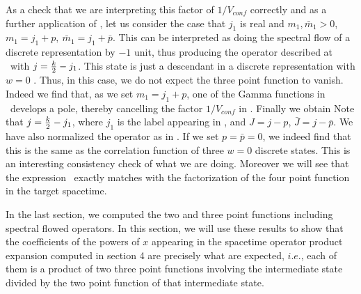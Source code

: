 As a check that we are interpreting this factor of $1/V_{conf}$
correctly and
as a further application of \threepx , let us consider the case that
$j_1$ is real and $m_1 , \bar m_1>0$, $ m_1 = j_1 + p , ~
\bar m_1 = j_1 + \bar p $.
This can be interpreted as doing the spectral flow of a discrete
representation by $-1$ unit, thus producing the operator described at
\statef\ with $j = {k \over 2} - j_1 $. This state is just a descendant
in a discrete representation with $w=0$ . Thus, in this case,
we do not expect the three point function to
vanish. Indeed we find that, as we set $m_1 = j_1 + p$,
one of the Gamma functions
in \threepx\ develops a pole, thereby cancelling the factor
$1/V_{conf}$ in \threepx . Finally we obtain
\eqn{}
Note that $j = {k \over 2} - j_1$, where $j_1$ is the label appearing
in \threepx , and $J = j- p$, $\bar J = j- \bar p$. We have also
normalized
the operator as in \newnorm .
If we set $p=\bar p =0$, we indeed find that this is the same as the
correlation function of three $w=0$ discrete states. This is an
interesting consistency check of what we are doing.
Moreover we will see that the expression \threepxus\
exactly matches with the factorization of the four point function
in the target spacetime.



In the last section, we computed the two and
three point functions including spectral flowed
operators. In this section, we will use these results
to show  that the coefficients of the powers of
$x$ appearing in the spacetime operator product expansion
computed in section 4 are precisely what
are expected, $i.e.$, each of them is a product of two
three point functions
involving the intermediate state divided by the two point function
of that intermediate state.



